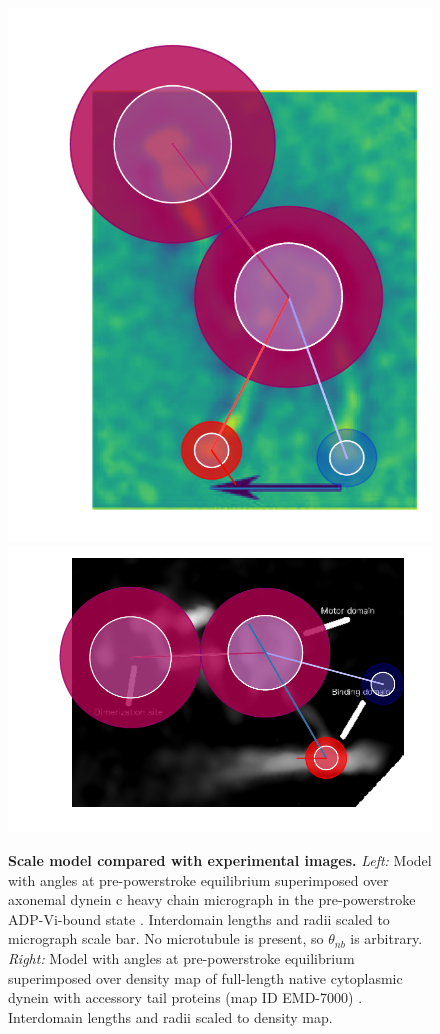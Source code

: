 \documentclass[9pt,twocolumn,twoside]{pnas-new}
\begin{document}
\begin{figure}[tbhp]
\includegraphics[width=0.4\linewidth]{../../plots/burgess-model-figure.pdf}%
\includegraphics[width=0.6\linewidth]{../../plots/grotjahn-model-figure.pdf}%
\caption{\textbf{Scale model compared with experimental images.} \textit{Left:} Model with angles at pre-powerstroke equilibrium superimposed over axonemal dynein c heavy chain micrograph in the pre-powerstroke ADP-Vi-bound state \cite{burgess-paper}. Interdomain lengths and radii scaled to micrograph scale bar. No microtubule is present, so $\theta_{nb}$ is arbitrary. \textit{Right: } Model with angles at pre-powerstroke equilibrium superimposed over density map of full-length native cytoplasmic dynein with accessory tail proteins (map ID EMD-7000) \cite{grotjahn}. Interdomain lengths and radii scaled to density map.}
\label{fig:micrographs}
\end{figure}


\end{document}
